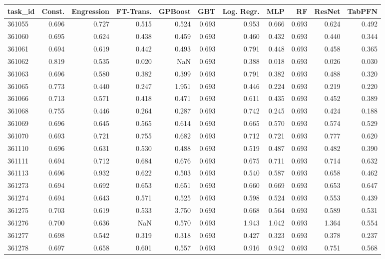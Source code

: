 \begin{tabular}{lrrrrrrrrrr}
\toprule
task\_id & Const. & Engression & FT-Trans. & GPBoost & GBT & Log. Regr. & MLP & RF & ResNet & TabPFN \\
\midrule
361055 & 0.696 & 0.727 & 0.515 & 0.524 & 0.693 & 0.953 & 0.666 & 0.693 & 0.624 & 0.492 \\
361060 & 0.695 & 0.624 & 0.438 & 0.459 & 0.693 & 0.460 & 0.432 & 0.693 & 0.440 & 0.344 \\
361061 & 0.694 & 0.619 & 0.442 & 0.493 & 0.693 & 0.791 & 0.448 & 0.693 & 0.458 & 0.365 \\
361062 & 0.819 & 0.535 & 0.020 & NaN & 0.693 & 0.388 & 0.018 & 0.693 & 0.026 & 0.030 \\
361063 & 0.696 & 0.580 & 0.382 & 0.399 & 0.693 & 0.791 & 0.382 & 0.693 & 0.488 & 0.320 \\
361065 & 0.773 & 0.440 & 0.247 & 1.951 & 0.693 & 0.446 & 0.224 & 0.693 & 0.219 & 0.220 \\
361066 & 0.713 & 0.571 & 0.418 & 0.471 & 0.693 & 0.611 & 0.435 & 0.693 & 0.452 & 0.389 \\
361068 & 0.755 & 0.446 & 0.264 & 0.287 & 0.693 & 0.742 & 0.245 & 0.693 & 0.424 & 0.188 \\
361069 & 0.696 & 0.645 & 0.565 & 0.614 & 0.693 & 0.665 & 0.570 & 0.693 & 0.574 & 0.529 \\
361070 & 0.693 & 0.721 & 0.755 & 0.682 & 0.693 & 0.712 & 0.721 & 0.693 & 0.777 & 0.620 \\
361110 & 0.696 & 0.631 & 0.530 & 0.488 & 0.693 & 0.519 & 0.487 & 0.693 & 0.482 & 0.390 \\
361111 & 0.694 & 0.712 & 0.684 & 0.676 & 0.693 & 0.675 & 0.711 & 0.693 & 0.714 & 0.632 \\
361113 & 0.696 & 0.932 & 0.622 & 0.503 & 0.693 & 0.540 & 0.587 & 0.693 & 0.658 & 0.462 \\
361273 & 0.694 & 0.692 & 0.653 & 0.651 & 0.693 & 0.660 & 0.669 & 0.693 & 0.653 & 0.647 \\
361274 & 0.694 & 0.643 & 0.571 & 0.525 & 0.693 & 0.598 & 0.524 & 0.693 & 0.553 & 0.439 \\
361275 & 0.703 & 0.619 & 0.533 & 3.750 & 0.693 & 0.668 & 0.564 & 0.693 & 0.589 & 0.531 \\
361276 & 0.700 & 0.636 & NaN & 0.570 & 0.693 & 1.943 & 1.042 & 0.693 & 1.364 & 0.554 \\
361277 & 0.698 & 0.542 & 0.319 & 0.318 & 0.693 & 0.427 & 0.323 & 0.693 & 0.378 & 0.237 \\
361278 & 0.697 & 0.658 & 0.601 & 0.557 & 0.693 & 0.916 & 0.942 & 0.693 & 0.751 & 0.568 \\

\end{tabular}
